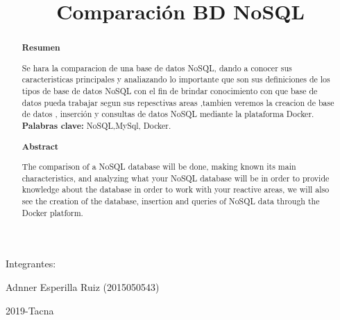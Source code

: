 \documentclass[%
 reprint,
 amsmath,amssymb,
 aps,
]{revtex4-1}
\begin{document}
\begin{titlepage}
\begin{center}
\vspace*{0.2in}
\vspace*{0.1in}
\begin{large}
Integrantes: \\
\begin{flushleft}
Adnner Esperilla Ruiz		\hfill	(2015050543) \\

\vspace*{0.5in}
\begin{center}
2019-Tacna\\
\end{center}
\vspace*{2in}
\end{flushleft}
\end{large}
\end{center}

\end{titlepage}


\title{Comparación BD NoSQL}
\begin{abstract}
\begin{center}
\textbf{Resumen}
\end{center}

Se hara la comparacion de una base de datos NoSQL, dando a conocer sus caracteristicas principales y analiazando lo importante que son sus definiciones de los tipos de base de datos NoSQL con el fin de brindar conocimiento con que base de datos pueda trabajar segun sus repesctivas areas ,tambien veremos la creacion de base de datos , inserción y consultas de datos NoSQL mediante la plataforma Docker.\\

\textbf{Palabras clave:}   NoSQL,MySql, Docker.\\

\begin{center}
\textbf{Abstract}
\end{center}
The comparison of a NoSQL database will be done, making known its main characteristics, and analyzing what your NoSQL database will be in order to provide knowledge about the database in order to work with your reactive areas, we will also see the creation of the database, insertion and queries of NoSQL data through the Docker platform. \\

\end{abstract}



\maketitle
\end{document}
